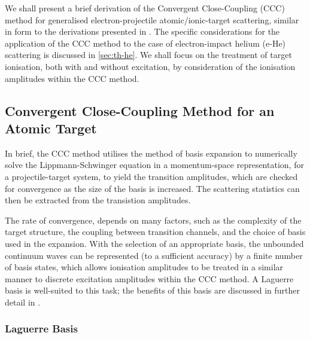 \documentclass[]{article}
\begin{document}
We shall present a brief derivation of the Convergent Close-Coupling (CCC)
method for generalised electron-projectile atomic/ionic-target scattering,
similar in form to the derivations presented in \cite{BRAY19951, AJP_BRAY1996}.
The specific considerations for the application of the CCC method to the case of
electron-impact helium (e-He) scattering is discussed in \autoref{sec:th-he}.
We shall focus on the treatment of target ionisation, both with and without
excitation, by consideration of the ionisation amplitudes within the CCC method.

\subsection{Convergent Close-Coupling Method for an Atomic Target}
\label{sec:th-ccc}

In brief, the CCC method utilises the method of basis expansion to numerically
solve the Lippmann-Schwinger equation in a momentum-space representation, for a
projectile-target system, to yield the transition amplitudes, which are checked
for convergence as the size of the basis is increased.
The scattering statistics can then be extracted from the transistion amplitudes.

The rate of convergence, depends on many factors, such as the complexity of the
target structure, the coupling between transition channels, and the choice of
basis used in the expansion.
With the selection of an appropriate basis, the unbounded continuum waves can be
represented (to a sufficient accuracy) by a finite number of basis states, which
allows ionisation amplitudes to be treated in a similar manner to discrete
excitation amplitudes within the CCC method.
A Laguerre basis is well-suited to this task; the benefits of this basis are
discussed in further detail in \cite[5-9]{BRAY19951}.

\subsubsection{Laguerre Basis}
\label{sec:th-ccc-lag}
\end{document}
